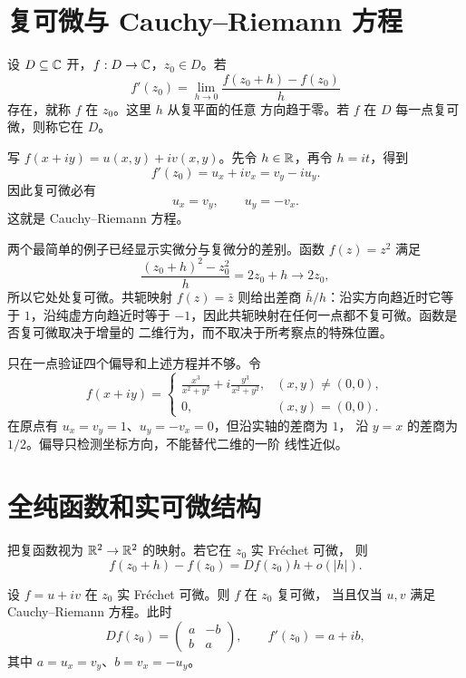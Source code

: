 \section{复可微与 Cauchy--Riemann 方程}

设 \(D\subseteq\mathbb{C}\) 开，\(f:D\to\mathbb{C}\)，\(z_0\in D\)。若
\[
 f'(z_0)=\lim_{h\to0}\frac{f(z_0+h)-f(z_0)}h
\]
存在，就称 \(f\) 在 \(z_0\)。这里 \(h\) 从复平面的任意
方向趋于零。若 \(f\) 在 \(D\) 每一点复可微，则称它在 \(D\)。

写 \(f(x+iy)=u(x,y)+iv(x,y)\)。先令 \(h\in\mathbb{R}\)，再令 \(h=it\)，得到
\[
 f'(z_0)=u_x+iv_x=v_y-iu_y.
\]
因此复可微必有
\begin{equation}
 u_x=v_y,\qquad u_y=-v_x.
 \label{eq:cauchy-riemann-cartesian}
\end{equation}
这就是 Cauchy--Riemann 方程。

两个最简单的例子已经显示实微分与复微分的差别。函数 \(f(z)=z^2\) 满足
\[
 \frac{(z_0+h)^2-z_0^2}{h}=2z_0+h\longrightarrow2z_0,
\]
所以它处处复可微。共轭映射 \(f(z)=\bar z\) 则给出差商
\(\bar h/h\)：沿实方向趋近时它等于 \(1\)，沿纯虚方向趋近时等于
\(-1\)，因此共轭映射在任何一点都不复可微。函数是否复可微取决于增量的
二维行为，而不取决于所考察点的特殊位置。

只在一点验证四个偏导和上述方程并不够。令
\[
 f(x+iy)=
 \begin{cases}
 \displaystyle\frac{x^3}{x^2+y^2}
 +i\frac{y^3}{x^2+y^2},&(x,y)\ne(0,0),\\[0.8em]
 0,&(x,y)=(0,0).
 \end{cases}
\]
在原点有 \(u_x=v_y=1\)、\(u_y=-v_x=0\)，但沿实轴的差商为 \(1\)，
沿 \(y=x\) 的差商为 \(1/2\)。偏导只检测坐标方向，不能替代二维的一阶
线性近似。

\section{全纯函数和实可微结构}

把复函数视为 \(\mathbb{R}^2\to\mathbb{R}^2\) 的映射。若它在 \(z_0\) 实 Fréchet 可微，
则
\[
 f(z_0+h)-f(z_0)=Df(z_0)h+o(|h|).
\]

\begin{theorem}[复可微的实微分判据]
\label{thm:complex-differentiability-real-criterion}
设 \(f=u+iv\) 在 \(z_0\) 实 Fréchet 可微。则 \(f\) 在 \(z_0\) 复可微，
当且仅当 \(u,v\) 满足 Cauchy--Riemann 方程。此时
\[
 Df(z_0)=\begin{pmatrix}a&-b\\ b&a\end{pmatrix},
 \qquad f'(z_0)=a+ib,
\]
其中 \(a=u_x=v_y\)、\(b=v_x=-u_y\)。
\end{theorem}

